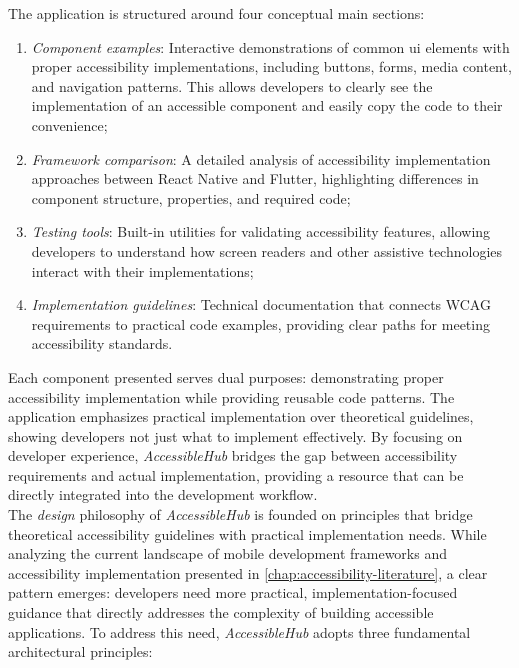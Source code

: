 The application is structured around four conceptual main sections:
\begin{enumerate}
    \item \textit{Component examples}: Interactive demonstrations of common \acrshort{ui} elements with proper accessibility implementations, including buttons, forms, media content, and navigation patterns. This allows developers to clearly see the implementation of an accessible component and easily copy the code to their convenience;
    
    \item \textit{Framework comparison}: A detailed analysis of accessibility implementation approaches between React Native and Flutter, highlighting differences in component structure, properties, and required code;
    
    \item \textit{Testing tools}: Built-in utilities for validating accessibility features, allowing developers to understand how screen readers and other assistive technologies interact with their implementations;
    
    \item \textit{Implementation guidelines}: Technical documentation that connects WCAG requirements to practical code examples, providing clear paths for meeting accessibility standards.
\end{enumerate}

Each component presented serves dual purposes: demonstrating proper accessibility implementation while providing reusable code patterns. The application emphasizes practical implementation over theoretical guidelines, showing developers not just what to implement effectively. By focusing on developer experience, \textit{AccessibleHub} bridges the gap between accessibility requirements and actual implementation, providing a resource that can be directly integrated into the development workflow. \\

The \textit{design} philosophy of \textit{AccessibleHub} is founded on principles that bridge theoretical accessibility guidelines with practical implementation needs. While analyzing the current landscape of mobile development frameworks and accessibility implementation presented in \ref{chap:accessibility-literature}, a clear pattern emerges: developers need more practical, implementation-focused guidance that directly addresses the complexity of building accessible applications. To address this need, \textit{AccessibleHub} adopts three fundamental architectural principles:

